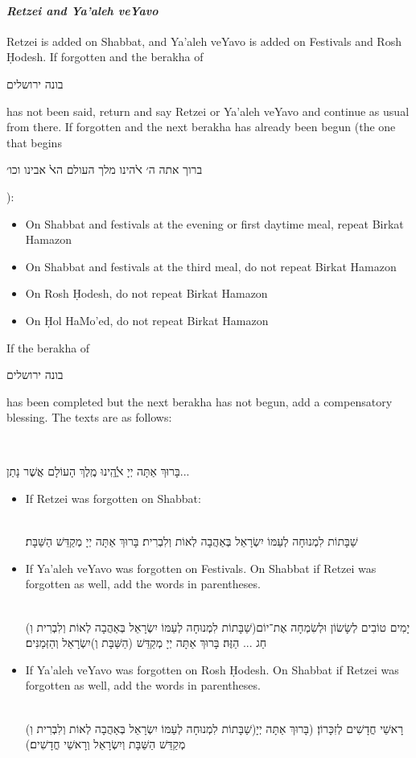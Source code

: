 \documentclass[11pt]{article}
\newcommand{\hebword}[1]{‎\begin{hebrew}\beginR #1 \endR\end{hebrew}}
\begin{document}
\paragraph{\textit{Retzei and Ya'aleh veYavo}} Retzei is added on Shabbat, and Ya'aleh veYavo is added on Festivals and Rosh \d{H}odesh.  If forgotten and the berakha of \hebword{בונה ירושלים} has not been said, return and say Retzei or Ya'aleh veYavo and continue as usual from there.  If forgotten and the next berakha has already been begun (the one that begins \hebword{ברוך אתה ה׳ ﭏהינו מלך העולם הﭏ אבינו וכו׳}): \begin{itemize}
	\item On Shabbat and festivals at the evening or first daytime meal, repeat Birkat Hamazon
	\item On Shabbat and festivals at the third meal, do not repeat Birkat Hamazon
	\item On Rosh \d{H}odesh, do not repeat Birkat Hamazon
	\item On \d{H}ol HaMo'ed, do not repeat Birkat Hamazon
\end{itemize}

If the berakha of \hebword{בונה ירושלים} has been completed but the next berakha has not begun, add a compensatory blessing.  The texts are as follows:

\hebword{בָּרוּךְ אַתָּה יְיָ ﭏֱֹהֵֽינוּ מֶֽלֶךְ הָעוֹלָם אֲשֶׁר נָתַן...}

\begin{itemize}
	\item If Retzei was forgotten on Shabbat:\\\hebword{שַׁבָּתוֹת לִמְנוּחָה לְעַמּוֹ יִשְׂרָאֵל בְּאַהֲבָה לְאוֹת וְלִבְרִית׃ בָּרוּךְ אַתָּה יְיָ מְקַדֵּשׁ הַשַּׁבָּת׃}
	\item If Ya'aleh veYavo was forgotten on Festivals. On Shabbat if Retzei was forgotten as well, add the words in parentheses.\\\hebword{
		(שַׁבָּתוֹת לִמְנוּחָה לְעַמּוֹ יִשְׂרָאֵל בְּאַהֲבָה לְאוֹת וְלִבְרִית וֽ)יָמִים טוֹבִים לְשָׂשׂוֹן וּלְשִׂמְחָה אֶת־יוֹם חַג ... הַזֶּה׃ בָּרוּךְ אַתָּה יְיָ מְקַדֵּשׁ (הַשַּׁבָּת וְ)יִשְׂרָאֵל וְהַזְּמַנִּים׃}
	\item If Ya'aleh veYavo was forgotten on Rosh \d{H}odesh.  On Shabbat if Retzei was forgotten as well, add the words in parentheses. \\\hebword{
		(שַׁבָּתוֹת לִמְנוּחָה לְעַמּוֹ יִשְׂרָאֵל בְּאַהֲבָה לְאוֹת וְלִבְרִית וֽ)רָאשֵׁי חֳדָשִׁים לְזִכָּרוֹן׃ (בָּרוּךְ אַתָּה יְיָ מְקַדֵּשׁ הַשַּׁבָּת וְיִשְׂרָאֵל וְרָאשֵׁי חֳדָשִׁים׃)}
\end{itemize}
\end{document}
